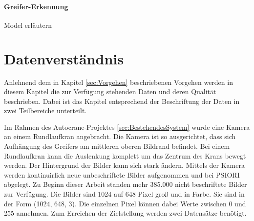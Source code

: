 	\paragraph{Greifer-Erkennung} Model erläutern 

	\section{Datenverständnis}
	\label{sec:DataUnderstanding}
	Anlehnend dem in Kapitel \ref{sec:Vorgehen} beschriebenen Vorgehen  werden in diesem Kapitel die zur Verfügung stehenden Daten und deren Qualität beschrieben. Dabei ist das Kapitel entsprechend der Beschriftung der Daten in zwei Teilbereiche unterteilt.
	
	Im Rahmen des Autocrane-Projektes \ref{sec:BestehendesSystem}  wurde eine Kamera an einem Rundlaufkran angebracht. Die Kamera ist so ausgerichtet, dass sich Aufhängung des Greifers am mittleren oberen Bildrand befindet. Bei einem Rundlaufkran kann die Auslenkung komplett um das Zentrum des Krans bewegt werden. Der Hintergrund der Bilder kann sich stark ändern. Mittels der Kamera werden kontinuirlich neue unbeschriftete Bilder aufgenommen und bei PSIORI abgelegt. Zu Beginn dieser Arbeit standen mehr 385.000 nicht beschriftete Bilder zur Verfügung. Die Bilder sind 1024 auf 648 Pixel groß und in Farbe. Sie sind in der Form (1024, 648, 3). Die einzelnen Pixel können dabei Werte zwischen 0 und 255 annehmen. 
	Zum Erreichen der Zielstellung werden zwei Datensätze benötigt.
	
